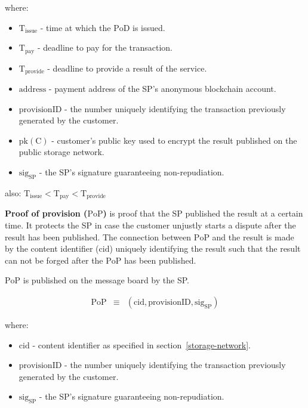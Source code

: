 where:

\begin{itemize}

\item $\mathrm{T}_\mathrm{issue}$ - time at which the $\mathrm{PoD}$ is issued.
\item
  $\mathrm{T}_\mathrm{pay}$ - deadline to pay for the transaction.
\item
  $\mathrm{T}_\mathrm{provide}$ - deadline to provide a result of the service.
\item $\mathrm{address}$ - payment address of the SP's anonymous blockchain account.
\item $\mathrm{provisionID}$ - the number uniquely identifying the transaction previously generated by the customer.
\item $\mathrm{pk(C)}$ - customer's public key used to encrypt the result published on the public storage network.
\item $\mathrm{sig}_\mathrm{SP}$ - the SP's signature guaranteeing non-repudiation.
\end{itemize}

also:
\(\mathrm{T}_\mathrm{issue} < \mathrm{T}_\mathrm{pay} < \mathrm{T}_\mathrm{provide}\)

\noindent \textbf
{Proof of provision ($\mathrm{PoP}$)}\label{proof-of-provision} is proof that the SP published the result at a certain time. It protects the SP in case the customer unjustly starts a dispute after the result has been published. The connection between $\mathrm{PoP}$ and the result is made by the content identifier ($\mathrm{cid}$) uniquely identifying the result such that the result can not be forged after the $\mathrm{PoP}$ has been published.

$\mathrm{PoP}$ is published on the message board by the SP.


\begin{eqnarray}
\mathrm{PoP} & \equiv & (\mathrm{cid}, \mathrm{provisionID}, \mathrm{sig}_\mathrm{SP})
\end{eqnarray}

where:

\begin{itemize}

\item $\mathrm{cid}$ - content identifier as specified in section~\ref{storage-network}.
\item $\mathrm{provisionID}$ - the number uniquely identifying the transaction previously generated by the customer.
\item $\mathrm{sig}_\mathrm{SP}$ - the SP's signature guaranteeing non-repudiation.
\end{itemize}

